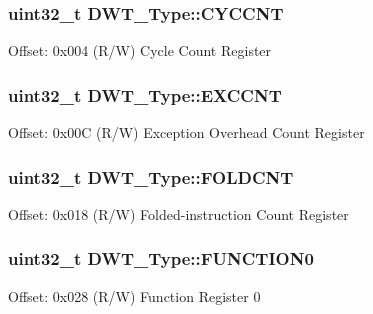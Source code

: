 \subsubsection[{\texorpdfstring{C\+Y\+C\+C\+NT}{CYCCNT}}]{ uint32\+\_\+t D\+W\+T\+\_\+\+Type\+::\+C\+Y\+C\+C\+NT}\hypertarget{structDWT__Type_a71680298e85e96e57002f87e7ab78fd4}{}\label{structDWT__Type_a71680298e85e96e57002f87e7ab78fd4}
Offset\+: 0x004 (R/W) Cycle Count Register 
\subsubsection[{\texorpdfstring{E\+X\+C\+C\+NT}{EXCCNT}}]{ uint32\+\_\+t D\+W\+T\+\_\+\+Type\+::\+E\+X\+C\+C\+NT}\hypertarget{structDWT__Type_ac0801a2328f3431e4706fed91c828f82}{}\label{structDWT__Type_ac0801a2328f3431e4706fed91c828f82}
Offset\+: 0x00C (R/W) Exception Overhead Count Register 
\subsubsection[{\texorpdfstring{F\+O\+L\+D\+C\+NT}{FOLDCNT}}]{ uint32\+\_\+t D\+W\+T\+\_\+\+Type\+::\+F\+O\+L\+D\+C\+NT}\hypertarget{structDWT__Type_a35f2315f870a574e3e6958face6584ab}{}\label{structDWT__Type_a35f2315f870a574e3e6958face6584ab}
Offset\+: 0x018 (R/W) Folded-\/instruction Count Register 
\subsubsection[{\texorpdfstring{F\+U\+N\+C\+T\+I\+O\+N0}{FUNCTION0}}]{ uint32\+\_\+t D\+W\+T\+\_\+\+Type\+::\+F\+U\+N\+C\+T\+I\+O\+N0}\hypertarget{structDWT__Type_a5fbd9947d110cc168941f6acadc4a729}{}\label{structDWT__Type_a5fbd9947d110cc168941f6acadc4a729}
Offset\+: 0x028 (R/W) Function Register 0 
